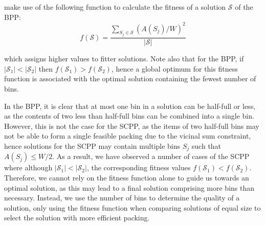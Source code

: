 \documentclass[authoryear]{elsarticle}
\begin{document}
\citet{falkenauer1992} make use of the following function to calculate the fitness of a solution $\mathcal{S}$ of the BPP:
\begin{equation}
f(\mathcal{S}) = \frac{\sum_{S_j \in \mathcal{S}} (A(S_j)/W)^2}{|\mathcal{S}|}
\label{eqn:fitness}
\end{equation}

\noindent which assigns higher values to fitter solutions. Note also that for the BPP, if $|\mathcal{S}_1| < |\mathcal{S}_2|$  then $f(\mathcal{S}_1) > f(\mathcal{S}_2)$, hence a global optimum for this fitness function is associated with the optimal solution containing the fewest number of bins.

In the BPP, it is clear that at most one bin in a solution can be half-full or less, as the contents of two less than half-full bins can be combined into a single bin. However, this is not the case for the SCPP, as the items of two half-full bins may not be able to form a single feasible packing due to the vicinal sum constraint, hence solutions for the SCPP may contain multiple bins $S_j$ such that $A(S_j) \leq W/2$. As a result, we have observed a number of cases of the SCPP where although  $|\mathcal{S}_1| < |\mathcal{S}_2|$, the corresponding fitness values $f(\mathcal{S}_1) < f(\mathcal{S}_2)$. Therefore, we cannot rely on the fitness function alone to guide us towards an optimal solution, as this may lead to a final solution comprising more bins than necessary. Instead, we use the number of bins to determine the quality of a solution, only using the fitness function when comparing solutions of equal size to select the solution with more efficient packing.
\end{document}
